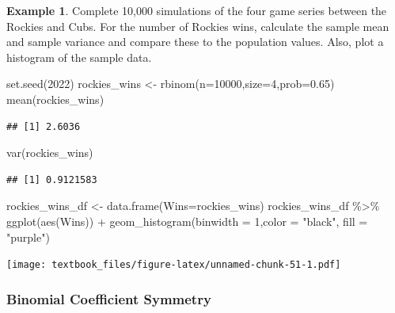 \documentclass[
  11pt,
]{book}
\newenvironment{Shaded}{\begin{snugshade}}{\end{snugshade}}
\newcommand{\AttributeTok}[1]{\textcolor[rgb]{0.77,0.63,0.00}{#1}}
\newcommand{\DecValTok}[1]{\textcolor[rgb]{0.00,0.00,0.81}{#1}}
\newcommand{\FloatTok}[1]{\textcolor[rgb]{0.00,0.00,0.81}{#1}}
\newcommand{\FunctionTok}[1]{\textcolor[rgb]{0.00,0.00,0.00}{#1}}
\newcommand{\NormalTok}[1]{#1}
\newcommand{\OtherTok}[1]{\textcolor[rgb]{0.56,0.35,0.01}{#1}}
\newcommand{\SpecialCharTok}[1]{\textcolor[rgb]{0.00,0.00,0.00}{#1}}
\newcommand{\StringTok}[1]{\textcolor[rgb]{0.31,0.60,0.02}{#1}}
\theoremstyle{definition}
\theoremstyle{definition}
\newtheorem{example}{Example}[chapter]
\theoremstyle{definition}
\theoremstyle{definition}
\theoremstyle{remark}
\begin{document}
\begin{example}
Complete 10,000 simulations of the four game series between the Rockies and Cubs. For the number of Rockies wins, calculate the sample mean and sample variance and compare these to the population values. Also, plot a histogram of the sample data.
\end{example}

\begin{Shaded}
\begin{Highlighting}[]
\FunctionTok{set.seed}\NormalTok{(}\DecValTok{2022}\NormalTok{)}
\NormalTok{rockies\_wins }\OtherTok{\textless{}{-}} \FunctionTok{rbinom}\NormalTok{(}\AttributeTok{n=}\DecValTok{10000}\NormalTok{,}\AttributeTok{size=}\DecValTok{4}\NormalTok{,}\AttributeTok{prob=}\FloatTok{0.65}\NormalTok{)}
\FunctionTok{mean}\NormalTok{(rockies\_wins)}
\end{Highlighting}
\end{Shaded}

\begin{verbatim}
## [1] 2.6036
\end{verbatim}

\begin{Shaded}
\begin{Highlighting}[]
\FunctionTok{var}\NormalTok{(rockies\_wins)}
\end{Highlighting}
\end{Shaded}

\begin{verbatim}
## [1] 0.9121583
\end{verbatim}

\begin{Shaded}
\begin{Highlighting}[]
\NormalTok{rockies\_wins\_df }\OtherTok{\textless{}{-}} \FunctionTok{data.frame}\NormalTok{(}\AttributeTok{Wins=}\NormalTok{rockies\_wins)}
\NormalTok{rockies\_wins\_df }\SpecialCharTok{\%\textgreater{}\%} \FunctionTok{ggplot}\NormalTok{(}\FunctionTok{aes}\NormalTok{(Wins)) }\SpecialCharTok{+} \FunctionTok{geom\_histogram}\NormalTok{(}\AttributeTok{binwidth =} \DecValTok{1}\NormalTok{,}\AttributeTok{color =} \StringTok{"black"}\NormalTok{, }\AttributeTok{fill =} \StringTok{"purple"}\NormalTok{)}
\end{Highlighting}
\end{Shaded}

\texttt{[image: textbook\_files/figure-latex/unnamed-chunk-51-1.pdf]}

\newpage

\hypertarget{binomial-coefficient-symmetry}{%
\subsubsection{Binomial Coefficient Symmetry}\label{binomial-coefficient-symmetry}}
\end{document}
